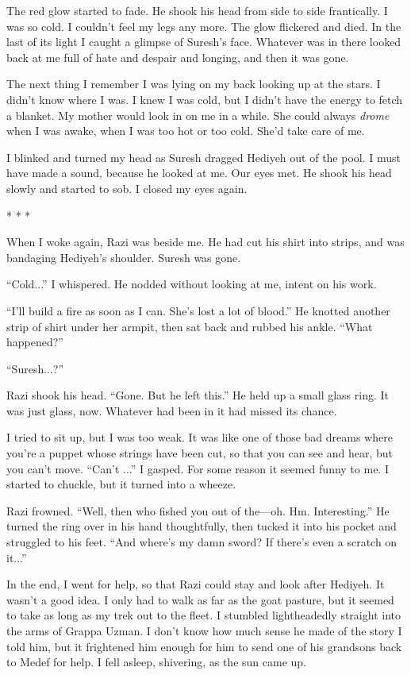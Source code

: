 The red glow started to fade.  He shook his head from side to side
frantically.  I was so cold.  I couldn't feel my legs any more.  The
glow flickered and died.  In the last of its light I caught a glimpse
of Suresh's face.  Whatever was in there looked back at me full of
hate and despair and longing, and then it was gone.

The next thing I remember I was lying on my back looking up at the
stars.  I didn't know where I was.  I knew I was cold, but I didn't
have the energy to fetch a blanket.  My mother would look in on me in
a while.  She could always \emph{drome} when I was awake, when I was too
hot or too cold.  She'd take care of me.

I blinked and turned my head as Suresh dragged Hediyeh out of the
pool.  I must have made a sound, because he looked at me.  Our eyes
met.  He shook his head slowly and started to sob.  I closed my eyes
again.

\begin{center}* * *\end{center}

When I woke again, Razi was beside me.  He had cut his shirt into
strips, and was bandaging Hediyeh's shoulder.  Suresh was gone.

``Cold...''  I whispered.  He nodded without looking at me, intent on
his work.

``I'll build a fire as soon as I can.  She's lost a lot of blood.''  He
knotted another strip of shirt under her armpit, then sat back and
rubbed his ankle.  ``What happened?''

``Suresh...?''

Razi shook his head.  ``Gone.  But he left this.''  He held up a small
glass ring.  It was just glass, now.  Whatever had been in it had
missed its chance.

I tried to sit up, but I was too weak.  It was like one of those bad
dreams where you're a puppet whose strings have been cut, so that you
can see and hear, but you can't move.  ``Can't ...''  I gasped.  For
some reason it seemed funny to me.  I started to chuckle, but it
turned into a wheeze.

Razi frowned.  ``Well, then who fished you out of the---oh.  Hm.
Interesting.''  He turned the ring over in his hand thoughtfully, then
tucked it into his pocket and struggled to his feet.  ``And where's my
damn sword?  If there's even a scratch on it...''

In the end, I went for help, so that Razi could stay and look after
Hediyeh.  It wasn't a good idea.  I only had to walk as far as the
goat pasture, but it seemed to take as long as my trek out to the
fleet.  I stumbled lightheadedly straight into the arms of Grappa
Uzman.  I don't know how much sense he made of the story I told him,
but it frightened him enough for him to send one of his grandsons back
to Medef for help.  I fell asleep, shivering, as the sun came up.


